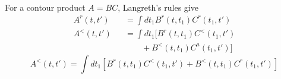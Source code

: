 
For a contour product $A=BC$, Langreth's rules give
\begin{eqnarray}\label{rules}
A^r(t,t') && = \int dt_1 B^r(t,t_1)C^r(t_1,t') \nonumber\\
A^<(t,t') && = \int dt_1 [B^r(t,t_1)C^<(t_1,t') \nonumber\\
&& \qquad +B^<(t,t_1)C^a(t_1,t')]
\end{eqnarray}
\begin{equation}\label{wrong}
A^<(t,t') = \int dt_1 [B^r(t,t_1)C^<(t_1,t') + B^<(t,t_1)C^r(t_1,t')]
\end{equation}

